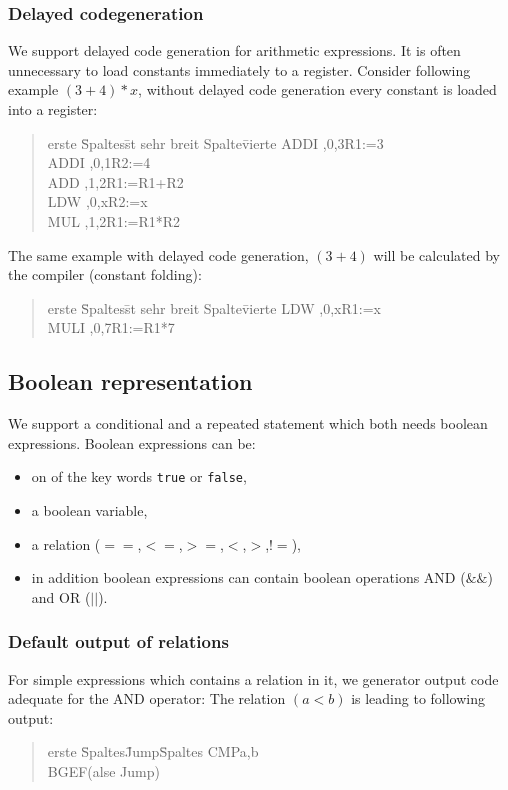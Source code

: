 \subsubsection{Delayed codegeneration}
We support delayed code generation for arithmetic expressions. It is often unnecessary to load constants immediately to a register.
Consider following example $(3 + 4) * x$, without delayed code generation every constant is loaded into a register:
\begin{quote}
\begin{tabbing}
erste \= Spaltes\=  st sehr breit Spalte\=vierte \kill
\>ADDI ,0,3\>R1:=3\\
\>ADDI ,0,1\>R2:=4\\
\>ADD ,1,2\>R1:=R1+R2\\
\>LDW ,0,x\>R2:=x\\
\>MUL ,1,2\>R1:=R1*R2\\
\end{tabbing}
\end{quote}
The same example with delayed code generation, $(3+4)$ will be calculated by the compiler (constant folding):
\begin{quote}
\begin{tabbing}
erste \= Spaltes\=  st sehr breit Spalte\=vierte \kill
\>LDW ,0,x\>R1:=x\\
\>MULI ,0,7\>R1:=R1*7\\
\end{tabbing}
\end{quote}

\subsection{Boolean representation}
\label{labelBoolean}
We support a conditional and a repeated statement which both needs boolean expressions. Boolean expressions can be:
\begin{itemize}
  \item on of the key words \texttt{true} or \texttt{false},
  \item a boolean variable,
  \item a relation ($==$,$<=$,$>=$,$<$,$>$,$!=$),
  \item in addition boolean expressions can contain boolean operations AND ($ \&\& $)  and OR ($||$). 
\end{itemize}

\subsubsection{Default output of relations}
For simple expressions which contains a relation in it, we generator output code adequate for the AND operator:
The relation $(a<b)$ is leading to following output:
\begin{quote}
\begin{tabbing}
erste \= Spaltes\=  Jump\= Spaltes \kill
\>CMP\>a,b\\
\>BGE\>\>F(alse Jump)\\
\end{tabbing}
\end{quote}

